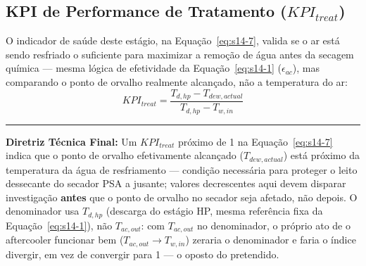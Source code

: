 \documentclass[12pt,a4paper]{article}
\numberwithin{equation}{section}
\numberwithin{table}{section}
\numberwithin{figure}{section}
\begin{document}
	\begin{table}[h!tbp]
		\centering
		\caption[Matriz de diagnóstico de tratamento primário]{Matriz de diagnóstico de tratamento primário.}
		\label{tab:14-1}
	\end{table}

	\subsection{KPI de Performance de Tratamento (\texorpdfstring{$KPI_{treat}$}{KPI treat})}
	O indicador de saúde deste estágio, na Equação~\eqref{eq:s14-7}, valida se o ar está sendo resfriado o suficiente para maximizar a remoção de água antes da secagem química — mesma lógica de efetividade da Equação~\eqref{eq:s14-1} ($\epsilon_{ac}$), mas comparando o ponto de orvalho realmente alcançado, não a temperatura do ar:
	\begin{equation}\label{eq:s14-7}
 \boxed{KPI_{treat} = \frac{T_{d,hp} - T_{dew,actual}}{T_{d,hp} - T_{w,in}}}
\end{equation}

	\vspace{1em}
	\hrule
	\vspace{1em}

	\textbf{Diretriz Técnica Final:} Um $KPI_{treat}$ próximo de 1 na Equação~\eqref{eq:s14-7} indica que o ponto de orvalho efetivamente alcançado ($T_{dew,actual}$) está próximo da temperatura da água de resfriamento — condição necessária para proteger o leito dessecante do secador PSA a jusante; valores decrescentes aqui devem disparar investigação \textbf{antes} que o ponto de orvalho no secador seja afetado, não depois. O denominador usa $T_{d,hp}$ (descarga do estágio HP, mesma referência fixa da Equação~\eqref{eq:s14-1}), não $T_{ac,out}$: com $T_{ac,out}$ no denominador, o próprio ato de o aftercooler funcionar bem ($T_{ac,out} \to T_{w,in}$) zeraria o denominador e faria o índice divergir, em vez de convergir para 1 — o oposto do pretendido.
\end{document}
